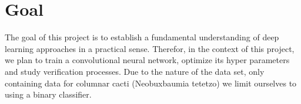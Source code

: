 \section{Goal}
The goal of this project is to establish a fundamental understanding of deep learning approaches in a practical sense. Therefor, in the context of this project, we plan to train a convolutional neural network, optimize its hyper parameters and study verification processes. Due to the nature of the data set, only containing data for columnar cacti (Neobuxbaumia tetetzo) we limit ourselves to using a binary classifier.
